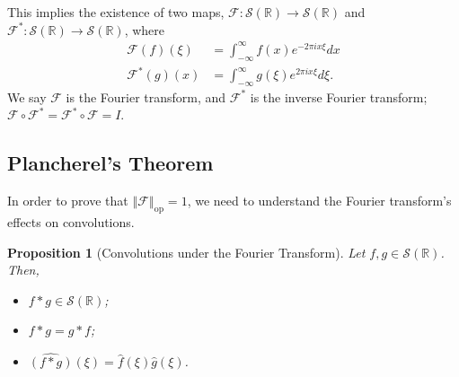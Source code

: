 \documentclass[12pt]{extarticle}
\newcommand{\R}{\mathbb{R}}
\newcommand{\norm}[1]{\left\Vert #1\right\Vert}
\theoremstyle{plain}
\newtheorem*{proposition}{Proposition}%
\theoremstyle{definition}
\theoremstyle{remark}
\begin{document}
  This implies the existence of two maps, $\mathcal{F}: \mathcal{S}(\R)\rightarrow \mathcal{S}(\R)$ and $\mathcal{F}^{\ast}:\mathcal{S}(\R)\rightarrow \mathcal{S}(\R)$, where
  \begin{align*}
    \mathcal{F}(f)(\xi) &= \int_{-\infty}^{\infty}f(x)e^{-2\pi i x \xi}dx\\
    \mathcal{F}^{\ast}(g)(x) &= \int_{-\infty}^{\infty} g(\xi)e^{2\pi i x \xi}d\xi.
  \end{align*}
  We say $\mathcal{F}$ is the Fourier transform, and $\mathcal{F}^{\ast}$ is the inverse Fourier transform; $\mathcal{F}\circ \mathcal{F}^{\ast} = \mathcal{F}^{\ast}\circ \mathcal{F} = I$.
  \subsection{Plancherel's Theorem}%
  In order to prove that $\norm{\mathcal{F}}_{\text{op}} = 1$, we need to understand the Fourier transform's effects on convolutions.
  \begin{proposition}[Convolutions under the Fourier Transform]
    Let $f,g\in \mathcal{S}(\R)$. Then,
    \begin{itemize}
      \item $f\ast g \in \mathcal{S}(\R)$;
      \item $f\ast g = g\ast f$;
      \item $\widehat{\left(f\ast g\right)}(\xi) = \hat{f}(\xi)\hat{g}(\xi)$.
    \end{itemize}
  \end{proposition}
\end{document}
